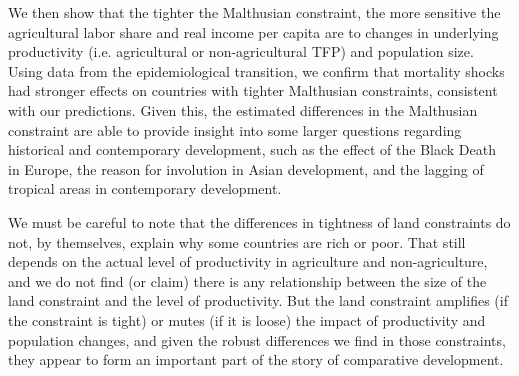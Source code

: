 \documentclass[11pt]{article}
\begin{document}
We then show that the tighter the Malthusian constraint, the more sensitive the agricultural labor share and real income per capita are to changes in underlying productivity (i.e. agricultural or non-agricultural TFP) and population size. Using data from the epidemiological transition, we confirm that mortality shocks had stronger effects on countries with tighter Malthusian constraints, consistent with our predictions. Given this, the estimated differences in the Malthusian constraint are able to provide insight into some larger questions regarding historical and contemporary development, such as the effect of the Black Death in Europe, the reason for involution in Asian development, and the lagging of tropical areas in contemporary development. 

We must be careful to note that the differences in tightness of land constraints do not, by themselves, explain why some countries are rich or poor. That still depends on the actual level of productivity in agriculture and non-agriculture, and we do not find (or claim) there is any relationship between the size of the land constraint and the level of productivity. But the land constraint amplifies (if the constraint is tight) or mutes (if it is loose) the impact of productivity and population changes, and given the robust differences we find in those constraints, they appear to form an important part of the story of comparative development.

\newpage

\clearpage

\onehalfspacing
{\small


}

\clearpage
\end{document}
